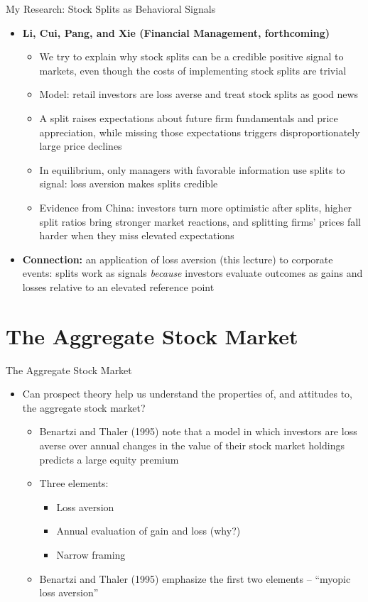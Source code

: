 \documentclass[aspectratio=169, 11pt]{beamer}
\begin{document}
\begin{frame}[shrink=5]{My Research: Stock Splits as Behavioral Signals}
	\begin{itemize}
		\item \textbf{Li, Cui, Pang, and Xie (Financial Management, forthcoming)}
		\begin{itemize}
			\item We try to explain why stock splits can be a credible positive signal to markets, even though the costs of implementing stock splits are trivial 
			\item Model: retail investors are loss averse and treat stock splits as good news
			\item A split raises expectations about future firm fundamentals and price appreciation, while missing those expectations triggers disproportionately large price declines
			\item In equilibrium, only managers with favorable information use splits to signal: loss aversion makes splits credible
			\item Evidence from China: investors turn more optimistic after splits, higher split ratios bring stronger market reactions, and splitting firms' prices fall harder when they miss elevated expectations
		\end{itemize}
		\item \textbf{Connection:} an application of loss aversion (this lecture) to corporate events: splits work as signals \emph{because} investors evaluate outcomes as gains and losses relative to an elevated reference point
	\end{itemize}
\end{frame}

\section{The Aggregate Stock Market}

\begin{frame}[shrink=5]{The Aggregate Stock Market}
\begin{itemize}
\item Can prospect theory help us understand the properties of, and attitudes to, the aggregate stock market?
  \begin{itemize}
  \item Benartzi and Thaler (1995) note that a model in which investors are loss averse over annual changes in the value of their stock market holdings predicts a large equity premium
  \item Three elements:
    \begin{itemize}
    \item Loss aversion
    \item Annual evaluation of gain and loss (why?)
    \item Narrow framing
    \end{itemize}
  \item Benartzi and Thaler (1995) emphasize the first two elements -- ``myopic loss aversion''
  \end{itemize}
\end{itemize}
\end{frame}
\end{document}
